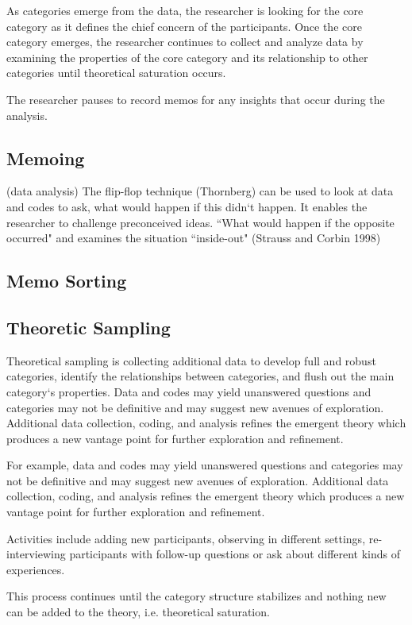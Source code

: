 As categories emerge from the data, the researcher is looking for the core category as it defines the chief concern of the participants. Once the core category emerges, the researcher continues to collect and analyze data by examining the properties of the core category and its relationship to other categories until theoretical saturation occurs.

The researcher pauses to record memos for any insights that occur during the analysis.
\subsection{Memoing}


(data analysis) The flip-flop technique (Thornberg) can be used to look at data and codes to ask, what would happen if this didn`t happen. It enables the researcher to challenge preconceived ideas. ``What would happen if the opposite occurred" and examines the situation ``inside-out" (Strauss and Corbin 1998)

\subsection{Memo Sorting}
\subsection{Theoretic Sampling}
Theoretical sampling is collecting additional data to develop full and robust categories, identify the relationships between categories, and flush out the main category`s properties. Data and codes may yield unanswered questions and categories may not be definitive and may suggest new avenues of exploration. Additional data collection, coding, and analysis refines the emergent theory which produces a new vantage point for further exploration and refinement.

For example, data and codes may yield unanswered questions and categories may not be definitive and may suggest new avenues of exploration. Additional data collection, coding, and analysis refines the emergent theory which produces a new vantage point for further exploration and refinement.

Activities include adding new participants, observing in different settings, re-interviewing participants with follow-up questions or ask about different kinds of experiences.

This process continues until the category structure stabilizes and nothing new can be added to the theory, i.e. theoretical saturation. 

